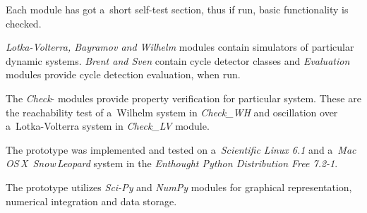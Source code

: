 \documentclass[12pt,twoside,draft]{fithesis}
\begin{document}
Each module has got a~short self-test section, thus if run, basic
functionality is checked.

\emph{Lotka-Volterra, Bayramov and Wilhelm} modules contain simulators of
particular dynamic systems. \emph{Brent and Sven} contain cycle detector
classes and \emph{Evaluation} modules provide cycle detection evaluation, when
run.

The \emph{Check}- modules provide property verification for particular system.
These are the reachability test of a~Wilhelm system in \emph{Check\_WH} and
oscillation over a~Lotka-Volterra system in \emph{Check\_LV} module.

The prototype was implemented and tested on a~\emph{Scientific Linux 6.1} and
a~\emph{Mac\,OS\,X~Snow\,Leopard} system in the
\emph{Enthought Python Distribution Free 7.2-1}.

The prototype utilizes \emph{Sci-Py} and \emph{NumPy} modules for graphical
representation, numerical integration and data storage.





\end{document}
